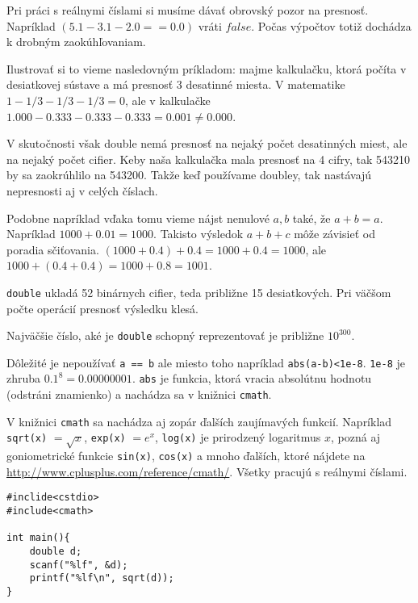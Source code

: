 Pri práci s reálnymi číslami si musíme dávať obrovský pozor na presnosť.
Napríklad $(5.1 - 3.1 - 2.0 == 0.0)$ vráti $false$. Počas výpočtov totiž
dochádza k drobným zaokúhľovaniam.

Ilustrovať si to vieme nasledovným príkladom: majme kalkulačku, ktorá počíta v
desiatkovej sústave a má presnosť 3 desatinné miesta.  V matematike $1 - 1/3 -
1/3 - 1/3 = 0$, ale v kalkulačke $1.000 - 0.333 - 0.333 - 0.333 = 0.001 \neq
0.000$. 

V skutočnosti však double nemá presnosť na nejaký počet desatinných miest, ale
na nejaký počet cifier. Keby naša kalkulačka mala presnosť na 4 cifry, tak
543210 by sa zaokrúhlilo na 543200. Takže keď používame doubley, tak nastávajú
nepresnosti aj v celých číslach.

Podobne napríklad vďaka tomu vieme nájst nenulové $a,b$ také, že $a + b = a$.
Napríklad $1000 + 0.01 = 1000$. Takisto výsledok $a + b + c$ môže závisieť od
poradia sčiťovania. $(1000 + 0.4) + 0.4 = 1000 + 0.4 = 1000$, ale $1000 + (0.4
+ 0.4) = 1000 + 0.8 = 1001$.

\medskip

\verb!double! ukladá 52 binárnych cifier, teda približne 15 desiatkových.  Pri
väčšom počte operácií presnosť výsledku klesá.

Najväčšie číslo, aké je \verb!double! schopný reprezentovať je približne
$10^{300}$.

\medskip

Dôležité je nepoužívať \verb!a == b! ale miesto toho napríklad
\verb!abs(a-b)<1e-8!.  \verb!1e-8! je zhruba $0.1^8 = 0.00000001$. \verb!abs!
je funkcia, ktorá vracia absolútnu hodnotu (odstráni znamienko) a nachádza sa v
knižnici \verb!cmath!.


V knižnici \verb!cmath! sa nachádza aj zopár ďalších zaujímavých funkcií. 
Napríklad \verb!sqrt(x)! $= \sqrt{x}$, \verb!exp(x)! $= e^x$, \verb!log(x)! je prirodzený
logaritmus $x$, pozná aj goniometrické funkcie \verb!sin(x)!, \verb!cos(x)! a mnoho ďalších,
ktoré nájdete na \url{http://www.cplusplus.com/reference/cmath/}. 
Všetky pracujú s reálnymi číslami.

\begin{lstlisting}
#inclide<cstdio>
#include<cmath>

int main(){
    double d;
    scanf("%lf", &d);
    printf("%lf\n", sqrt(d));
}
\end{lstlisting}










